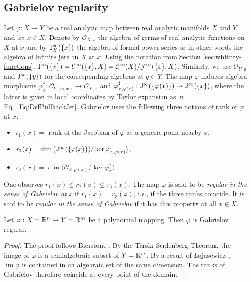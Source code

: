 

\subsection{Gabrielov regularity}
\label{App:Gabrielov}

Let $\varphi: X\to Y$ be a real analytic map between real analytic manifolds
$X$ and $Y$ and let $x\in X$. Denote by $\mathcal O_{X,x}$ the algebra of 
germs of real analytic functions on $X$  at $x$ and by
$ \mathsf{J}^\infty_{X} (\{x\})$ the algebra of formal power series 
or in other words the algebra of infinite jets on $X$ at $x$. 
Using the notation from Section \ref{sec:whitney-functions},
$\mathsf{J}^\infty (\{x\}) = \mathcal{E}^\infty (\{ x \},X) = \mathcal{C}^\infty (X)/ \mathcal{J}^\infty (\{ x \} , X) $.
Similarly, we use $\mathcal O_{Y,y}$ and 
$\mathsf{J}^\infty (\{ y \} )$ for the corresponding algebras at 
$y\in Y$. The map $\varphi$ induces algebra morphisms
$\varphi_x^*: \mathcal O_{Y,\varphi(x)}\to \mathcal O_{X,x}$ and
$\varphi_{x,\varphi(x)}^{\sharp}:  \mathsf{J}^\infty (\{ \varphi(x) \} )\to  \mathsf{J}^\infty (\{x\})$,
where the latter is  given in local coordinates by Taylor expansion as in Eq.~\eqref{Eq:DefPullbackJet}.
%
Gabrielov \cite{GabFRAF} uses the following three notions of rank of $\varphi$ at $x$:
\begin{itemize}
\item $r_1(x)=$ rank of the Jacobian of $\varphi$ at a generic point nearby $x$,
\item $r_2(x)= \dim \big( \mathsf{J}^\infty (\{ \varphi(x) \} ) / \ker \varphi_{x,\varphi(x)}^{\sharp} \big)$,
\item $r_3(x)=\dim \big( \mathcal O_{Y,\varphi(x)}/\ker \varphi_x^* \big)$.
\end{itemize}
One observes $r_1(x)\le r_2(x)\le r_3(x)$. The map $\varphi$ is said to be 
\emph{regular in the sense of Gabrielov at} $x$ if $r_1(x)=r_3(x)$, i.e., if the three ranks 
coincide. It is said to be \emph{regular in the sense of Gabrielov} if it has this property 
at all $x\in X$.

\begin{proposition}
\label{Prop:GabrielovRegularityPolynomials}
  Let  $\varphi: X= \mathbb{R}^n \to Y =\mathbb{R}^m$ be a polynomial mapping. Then $\varphi$ is Gabrielov regular. 
\end{proposition}

\begin{proof}
  The proof follows Bierstone \cite{BiePC}.
  By the Tarski-Seidenberg Theorem, the image of $\varphi$ is a semialgebraic subset of $Y=\mathbb{R}^m$.
  By  a result of {\L}ojasewicz \cite{LojESA}, \cite[Thm.~2.13]{BieMilSSS}, $\operatorname{im} \varphi$ is contained 
  in an algebraic set of the same dimension. The ranks of Gabrielov therefore coincide at every point 
  of the domain. 
\end{proof}


